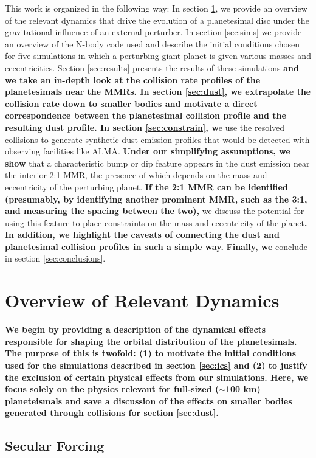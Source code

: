 \documentclass[fleqn,usenatbib]{mnras}
\begin{document}
This work is organized in the following way: In section \ref{sec:dynamics}, we provide an overview of the relevant dynamics that drive the evolution 
of a planetesimal disc under the gravitational influence of an external perturber. In section \ref{sec:sims} we provide an overview of the N-body code 
used and describe the initial conditions chosen for five simulations in which a perturbing giant planet is given various masses  and eccentricities. Section
\ref{sec:results} presents the results of these simulations \textbf{and we take an in-depth look at the collision rate profiles of the planetesimals near the MMRs. 
In section \ref{sec:dust},  we extrapolate the collision rate down to smaller bodies and motivate a direct correspondence between the planetesimal collision profile
and the resulting dust profile. In section \ref{sec:constrain}, w}e use the resolved collisions to generate synthetic dust 
emission profiles that would be detected with observing facilities like ALMA. \textbf{Under our simplifying assumptions, we show} that a characteristic bump 
or dip feature appears in the dust emission near the interior 2:1 MMR, the presence of which depends on the mass and eccentricity of the perturbing 
planet. \textbf{If the 2:1 MMR can be identified (presumably, by identifying another prominent MMR, such as the 3:1, and measuring the spacing between the two),} we discuss the 
potential for using this feature to place constraints on the mass and eccentricity of the planet\textbf{. In addition, we highlight the caveats of connecting the dust and planetesimal collision 
profiles in such a simple way.} \textbf{Finally, we} conclude in section \ref{sec:conclusions}.

\section{Overview of Relevant Dynamics} \label{sec:dynamics}

\textbf{We begin by providing a description of the dynamical effects responsible for shaping the orbital distribution of the planetesimals. The purpose of this is twofold: (1) to motivate
the initial conditions used for the simulations described in section \ref{sec:ics} and (2) to justify the exclusion of certain physical effects from our simulations. Here, we focus solely on the 
physics relevant for full-sized ($\sim$100 km) planeteismals and save a discussion of the effects on smaller bodies generated through collisions for section \ref{sec:dust}.}

\subsection{Secular Forcing}\label{sec:sec_force}
\end{document}
